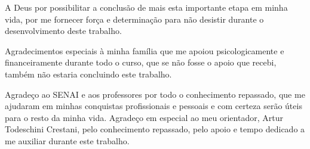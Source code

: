 \begin{agradecimentos}
A Deus por possibilitar a conclusão de mais esta importante etapa em minha vida, por me fornecer força e determinação para não desistir durante o desenvolvimento deste trabalho.

Agradecimentos especiais à minha família que me apoiou psicologicamente e financeiramente durante todo o curso, que se não fosse o apoio que recebi, também não estaria concluindo este trabalho.

Agradeço ao SENAI e aos professores por todo o conhecimento repassado, que me ajudaram em minhas conquistas profissionais e pessoais e com certeza serão úteis para o resto da minha vida. Agradeço em especial ao meu orientador, Artur Todeschini Crestani, pelo conhecimento repassado, pelo apoio e tempo dedicado a me auxiliar durante este trabalho.
\end{agradecimentos}
